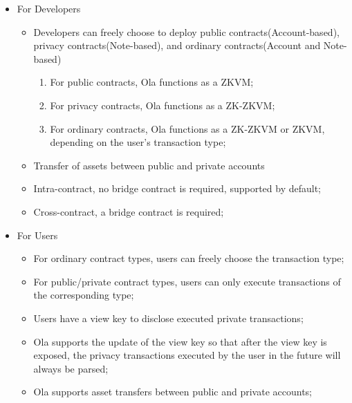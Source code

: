 \begin{itemize}
\item For Developers
    \begin{itemize}
    \item Developers can freely choose to deploy public contracts(Account-based), privacy contracts(Note-based), and ordinary contracts(Account and Note-based)
        \begin{enumerate}
        \item For public contracts, Ola functions as a ZKVM;
        \item For privacy contracts, Ola functions as a ZK-ZKVM;
        \item For ordinary contracts, Ola functions as a ZK-ZKVM or ZKVM, depending on the user's transaction type;
        \end{enumerate}
    \item Transfer of assets between public and private accounts
    \item Intra-contract, no bridge contract is required, supported by default;
    \item Cross-contract, a bridge contract is required;
    \end{itemize}
\item For Users
    \begin{itemize}
    \item For ordinary contract types, users can freely choose the transaction type;
    \item For public/private contract types, users can only execute transactions of the corresponding type;
    \item Users have a view key to disclose executed private transactions;
    \item Ola supports the update of the view key so that after the view key is exposed, the privacy transactions executed by the user in the future will always be parsed;
    \item Ola supports asset transfers between public and private accounts;
    \end{itemize}
\end{itemize}
